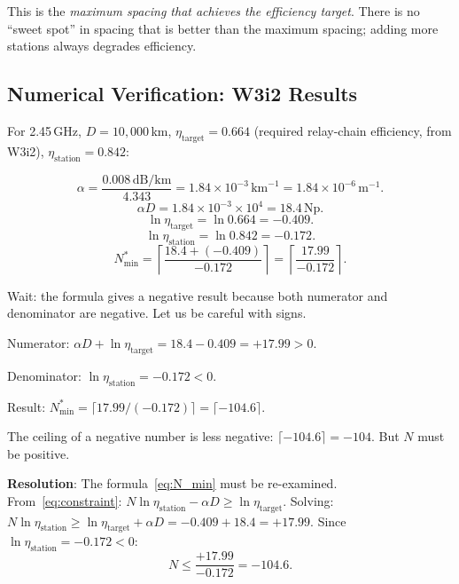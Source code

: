 \documentclass[aps,prd,twocolumn,superscriptaddress]{revtex4-2}
\begin{document}
This is the \emph{maximum spacing that achieves the efficiency target}.
There is no ``sweet spot'' in spacing that is better than the maximum
spacing; adding more stations always degrades efficiency.

\subsection{Numerical Verification: W3i2 Results}

For 2.45\,GHz, $D = 10{,}000$\,km, $\eta_\mathrm{target} = 0.664$
(required relay-chain efficiency, from W3i2), $\eta_\mathrm{station} = 0.842$:

\begin{equation}
\alpha = \frac{0.008\,\mathrm{dB/km}}{4.343} = 1.84\times10^{-3}\,\mathrm{km}^{-1}
= 1.84\times10^{-6}\,\mathrm{m}^{-1}.
\end{equation}
\begin{equation}
\alpha D = 1.84\times10^{-3}\times10^4 = 18.4\,\mathrm{Np}.
\end{equation}
\begin{equation}
\ln\eta_\mathrm{target} = \ln 0.664 = -0.409.
\end{equation}
\begin{equation}
\ln\eta_\mathrm{station} = \ln 0.842 = -0.172.
\end{equation}
\begin{equation}
N^*_\mathrm{min} = \left\lceil\frac{18.4 + (-0.409)}{-0.172}\right\rceil
= \left\lceil\frac{17.99}{-0.172}\right\rceil.
\label{eq:N_calc}
\end{equation}

Wait: the formula gives a negative result because both numerator and
denominator are negative.  Let us be careful with signs.

Numerator: $\alpha D + \ln\eta_\mathrm{target} = 18.4 - 0.409 = +17.99 > 0$.

Denominator: $\ln\eta_\mathrm{station} = -0.172 < 0$.

Result: $N^*_\mathrm{min} = \lceil 17.99/(-0.172)\rceil = \lceil-104.6\rceil$.

The ceiling of a negative number is less negative: $\lceil-104.6\rceil = -104$.
But $N$ must be positive.

\textbf{Resolution}: The formula~\eqref{eq:N_min} must be re-examined.
From~\eqref{eq:constraint}: $N\ln\eta_\mathrm{station} - \alpha D \geq \ln\eta_\mathrm{target}$.
Solving: $N\ln\eta_\mathrm{station} \geq \ln\eta_\mathrm{target} + \alpha D
= -0.409 + 18.4 = +17.99$.  Since $\ln\eta_\mathrm{station} = -0.172 < 0$:
\begin{equation}
N \leq \frac{+17.99}{-0.172} = -104.6.
\label{eq:N_neg}
\end{equation}
\end{document}
